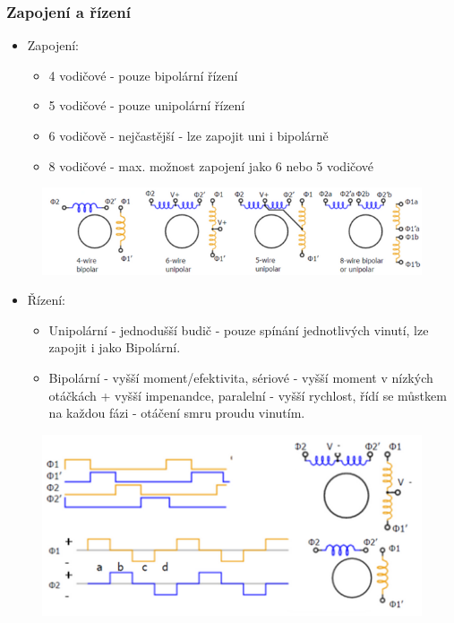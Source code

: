 \subsubsection*{Zapojení a řízení}
\begin{itemize}
    \item Zapojení: \begin{itemize}
              \item 4 vodičové - pouze bipolární řízení
              \item 5 vodičové - pouze unipolární řízení
              \item 6 vodičově - nejčastější - lze zapojit uni i bipolárně
              \item 8 vodičové - max. možnost zapojení jako 6 nebo 5 vodičové
          \end{itemize}
\end{itemize}

\begin{figure}[h]
    \begin{center}
        \includegraphics[scale = 1]{img/picture8.png}
    \end{center}
\end{figure}

\begin{itemize}
    \item Řízení: \begin{itemize}
              \item Unipolární - jednodušší budič - pouze spínání jednotlivých vinutí, lze zapojit i jako Bipolární.
              \item Bipolární - vyšší moment/efektivita, sériové - vyšší moment v nízkých otáčkách + vyšší impenandce, paralelní - vyšší rychlost, řídí se můstkem na každou fázi - otáčení smru proudu vinutím.
          \end{itemize}
\end{itemize}

\begin{figure}[h]
    \begin{center}
        \includegraphics[scale = 1]{img/Picture9.png}
    \end{center}
\end{figure}

